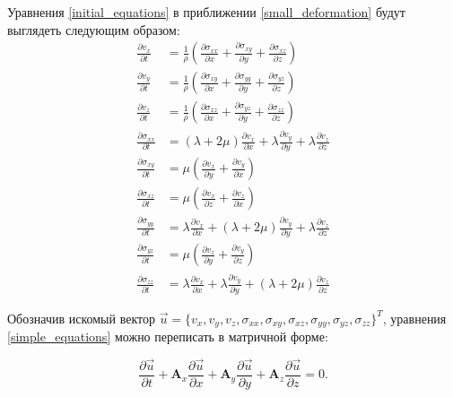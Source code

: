 	Уравнения \eqref{initial_equations} в приближении \eqref{small_deformation} будут выглядеть следующим образом: 
\begin{align}
	\label{simple_equations}
	\frac{\partial{v_x}}{\partial{t}}&=\frac{1}{\rho}(\frac{\partial{\sigma_{xx}}}{\partial{x}}+\frac{\partial{\sigma_{xy}}}{\partial{y}}+\frac{\partial{\sigma_{xz}}}{\partial{z}})
	\nonumber\\
	\frac{\partial{v_y}}{\partial{t}}&=\frac{1}{\rho}(\frac{\partial{\sigma_{xy}}}{\partial{x}}+\frac{\partial{\sigma_{yy}}}{\partial{y}}+\frac{\partial{\sigma_{yz}}}{\partial{z}})
	\nonumber\\
	\frac{\partial{v_z}}{\partial{t}}&=\frac{1}{\rho}(\frac{\partial{\sigma_{xz}}}{\partial{x}}+\frac{\partial{\sigma_{yz}}}{\partial{y}}+\frac{\partial{\sigma_{zz}}}{\partial{z}})
	\nonumber\\
	\frac{\partial{\sigma_{xx}}}{\partial{t}}&=(\lambda+2\mu)\frac{\partial{v_x}}{\partial{x}}+\lambda\frac{\partial{v_y}}{\partial{y}}+\lambda\frac{\partial{v_z}}{\partial{z}}
	\nonumber\\
	\frac{\partial{\sigma_{xy}}}{\partial{t}}&=\mu(\frac{\partial{v_x}}{\partial{y}}+\frac{\partial{v_y}}{\partial{x}})
	\nonumber\\
	\frac{\partial{\sigma_{xz}}}{\partial{t}}&=\mu(\frac{\partial{v_x}}{\partial{z}}+\frac{\partial{v_z}}{\partial{x}})
	\nonumber\\
	\frac{\partial{\sigma_{yy}}}{\partial{t}}&=\lambda\frac{\partial{v_x}}{\partial{x}}+(\lambda+2\mu)\frac{\partial{v_y}}{\partial{y}}+\lambda\frac{\partial{v_z}}{\partial{z}}
	\nonumber\\
	\frac{\partial{\sigma_{yz}}}{\partial{t}}&=\mu(\frac{\partial{v_z}}{\partial{y}}+\frac{\partial{v_y}}{\partial{z}})
	\nonumber\\
	\frac{\partial{\sigma_{zz}}}{\partial{t}}&=\lambda\frac{\partial{v_x}}{\partial{x}}+\lambda\frac{\partial{v_y}}{\partial{y}}+(\lambda+2\mu)\frac{\partial{v_z}}{\partial{z}}
\end{align}

	Обозначив искомый вектор $\vec{u}=\{v_x,v_y,v_z,\sigma_{xx},\sigma_{xy},\sigma_{xz},\sigma_{yy},\sigma_{yz},\sigma_{zz}\}^T$, уравнения \eqref{simple_equations} можно переписать в матричной форме:

\begin{equation}
	\label{simple_matrix_equation}
	\frac{\partial\vec{u}}{\partial{t}}+\mathbf{A}_x\frac{\partial\vec{u}}{\partial{x}}+
	\mathbf{A}_y\frac{\partial\vec{u}}{\partial{y}}+
	\mathbf{A}_z\frac{\partial\vec{u}}{\partial{z}}=0.
\end{equation}

